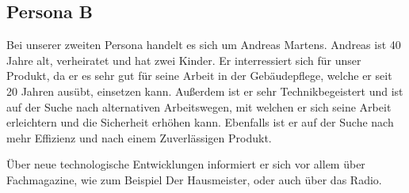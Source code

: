 \subsection{Persona B} \label{personaB}
    Bei unserer zweiten Persona handelt es sich um Andreas Martens. Andreas ist 40 Jahre alt, verheiratet und hat zwei 
    Kinder. Er interressiert sich für unser Produkt, da er es sehr gut für seine Arbeit in der Gebäudepflege, welche er 
    seit 20 Jahren ausübt, einsetzen kann. Außerdem ist er sehr Technikbegeistert und ist auf der Suche nach 
    alternativen Arbeitswegen, mit welchen er sich seine Arbeit erleichtern und die Sicherheit erhöhen kann. Ebenfalls 
    ist er auf der Suche nach mehr Effizienz und nach einem Zuverlässigen Produkt.

    Über neue technologische Entwicklungen informiert er sich vor allem über Fachmagazine, wie zum Beispiel \as Der
    Hausmeister\adl, oder auch über das Radio.